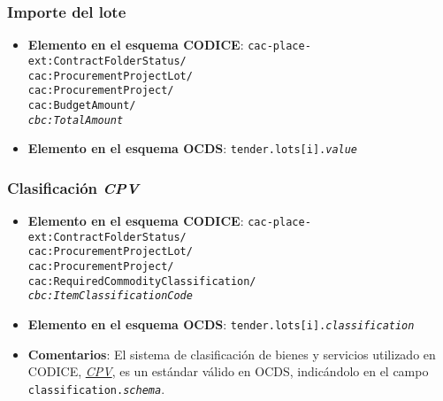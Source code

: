         \subsubsection{Importe del lote}
            \begin{itemize}
                \item \textbf{Elemento en el esquema CODICE}:
                    \tabto{7.6cm} \texttt{cac-place-ext:ContractFolderStatus/} \\
                    \tabto{7.6cm} \texttt{cac:ProcurementProjectLot/} \\
                    \tabto{7.6cm} \texttt{cac:ProcurementProject/} \\
                    \tabto{7.6cm} \texttt{cac:BudgetAmount/} \\
                    \tabto{7.6cm} \texttt{\textit{cbc:TotalAmount}}
                \item \textbf{Elemento en el esquema OCDS}:
                    \tabto{7.6cm} \texttt{tender.lots[i].\textit{value}}
            \end{itemize}
            
        \subsubsection{Clasificación \textit{CPV}}
            \begin{itemize}
                \item \textbf{Elemento en el esquema CODICE}:
                    \tabto{7.6cm} \texttt{cac-place-ext:ContractFolderStatus/} \\
                    \tabto{7.6cm} \texttt{cac:ProcurementProjectLot/} \\
                    \tabto{7.6cm} \texttt{cac:ProcurementProject/} \\
                    \tabto{7.6cm} \texttt{cac:RequiredCommodityClassification/} \\
                    \tabto{7.6cm} \texttt{\textit{cbc:ItemClassificationCode}}
                \item \textbf{Elemento en el esquema OCDS}:
                    \tabto{7.6cm} \texttt{tender.lots[i].\textit{classification}}
                \item \textbf{Comentarios}: El sistema de clasificación de bienes y servicios utilizado en CODICE, \href{https://www.licitaciones.es/codigos-cpv}{\textit{CPV}}, es un estándar válido en OCDS, indicándolo en el campo \texttt{classification.\textit{schema}}.
            \end{itemize}

